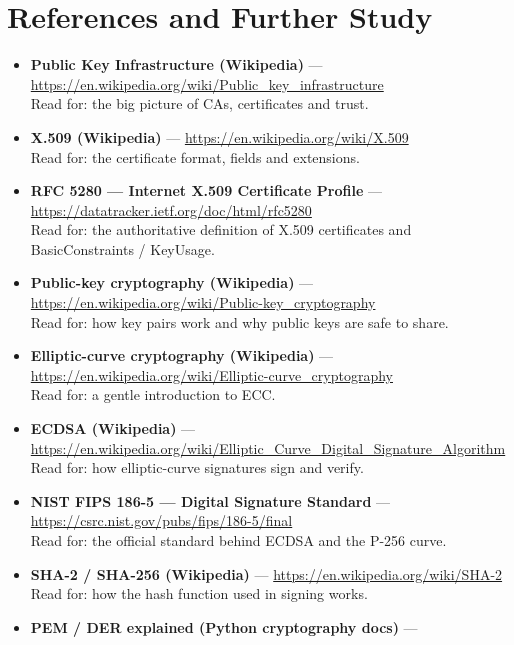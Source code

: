 \documentclass[11pt,a4paper]{report}
\begin{document}
\section{References and Further Study}
\begin{itemize}
  \item \textbf{Public Key Infrastructure (Wikipedia)} ---
        \url{https://en.wikipedia.org/wiki/Public_key_infrastructure}\\
        Read for: the big picture of CAs, certificates and trust.
  \item \textbf{X.509 (Wikipedia)} ---
        \url{https://en.wikipedia.org/wiki/X.509}\\
        Read for: the certificate format, fields and extensions.
  \item \textbf{RFC 5280 --- Internet X.509 Certificate Profile} ---
        \url{https://datatracker.ietf.org/doc/html/rfc5280}\\
        Read for: the authoritative definition of X.509 certificates and
        BasicConstraints / KeyUsage.
  \item \textbf{Public-key cryptography (Wikipedia)} ---
        \url{https://en.wikipedia.org/wiki/Public-key_cryptography}\\
        Read for: how key pairs work and why public keys are safe to share.
  \item \textbf{Elliptic-curve cryptography (Wikipedia)} ---
        \url{https://en.wikipedia.org/wiki/Elliptic-curve_cryptography}\\
        Read for: a gentle introduction to ECC.
  \item \textbf{ECDSA (Wikipedia)} ---
        \url{https://en.wikipedia.org/wiki/Elliptic_Curve_Digital_Signature_Algorithm}\\
        Read for: how elliptic-curve signatures sign and verify.
  \item \textbf{NIST FIPS 186-5 --- Digital Signature Standard} ---
        \url{https://csrc.nist.gov/pubs/fips/186-5/final}\\
        Read for: the official standard behind ECDSA and the P-256 curve.
  \item \textbf{SHA-2 / SHA-256 (Wikipedia)} ---
        \url{https://en.wikipedia.org/wiki/SHA-2}\\
        Read for: how the hash function used in signing works.
  \item \textbf{PEM / DER explained (Python cryptography docs)} ---

\end{itemize}
\end{document}
